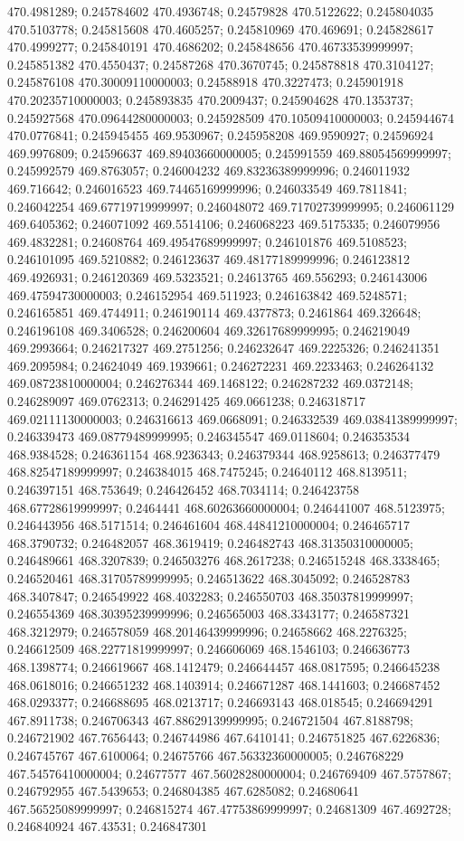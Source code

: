 470.4981289; 0.245784602 470.4936748; 0.24579828 470.5122622; 0.245804035 470.5103778; 0.245815608 470.4605257; 0.245810969 470.469691; 0.245828617 470.4999277; 0.245840191 470.4686202; 0.245848656 470.46733539999997; 0.245851382 470.4550437; 0.24587268 470.3670745; 0.245878818 470.3104127; 0.245876108 470.30009110000003; 0.24588918 470.3227473; 0.245901918 470.20235710000003; 0.245893835 470.2009437; 0.245904628 470.1353737; 0.245927568 470.09644280000003; 0.245928509 470.10509410000003; 0.245944674 470.0776841; 0.245945455 469.9530967; 0.245958208 469.9590927; 0.24596924 469.9976809; 0.24596637 469.89403660000005; 0.245991559 469.88054569999997; 0.245992579 469.8763057; 0.246004232 469.83236389999996; 0.246011932 469.716642; 0.246016523 469.74465169999996; 0.246033549 469.7811841; 0.246042254 469.67719719999997; 0.246048072 469.71702739999995; 0.246061129 469.6405362; 0.246071092 469.5514106; 0.246068223 469.5175335; 0.246079956 469.4832281; 0.24608764 469.49547689999997; 0.246101876 469.5108523; 0.246101095 469.5210882; 0.246123637 469.48177189999996; 0.246123812 469.4926931; 0.246120369 469.5323521; 0.24613765 469.556293; 0.246143006 469.47594730000003; 0.246152954 469.511923; 0.246163842 469.5248571; 0.246165851 469.4744911; 0.246190114 469.4377873; 0.2461864 469.326648; 0.246196108 469.3406528; 0.246200604 469.32617689999995; 0.246219049 469.2993664; 0.246217327 469.2751256; 0.246232647 469.2225326; 0.246241351 469.2095984; 0.24624049 469.1939661; 0.246272231 469.2233463; 0.246264132 469.08723810000004; 0.246276344 469.1468122; 0.246287232 469.0372148; 0.246289097 469.0762313; 0.246291425 469.0661238; 0.246318717 469.02111130000003; 0.246316613 469.0668091; 0.246332539 469.03841389999997; 0.246339473 469.08779489999995; 0.246345547 469.0118604; 0.246353534 468.9384528; 0.246361154 468.9236343; 0.246379344 468.9258613; 0.246377479 468.82547189999997; 0.246384015 468.7475245; 0.24640112 468.8139511; 0.246397151 468.753649; 0.246426452 468.7034114; 0.246423758 468.67728619999997; 0.2464441 468.60263660000004; 0.246441007 468.5123975; 0.246443956 468.5171514; 0.246461604 468.44841210000004; 0.246465717 468.3790732; 0.246482057 468.3619419; 0.246482743 468.31350310000005; 0.246489661 468.3207839; 0.246503276 468.2617238; 0.246515248 468.3338465; 0.246520461 468.31705789999995; 0.246513622 468.3045092; 0.246528783 468.3407847; 0.246549922 468.4032283; 0.246550703 468.35037819999997; 0.246554369 468.30395239999996; 0.246565003 468.3343177; 0.246587321 468.3212979; 0.246578059 468.20146439999996; 0.24658662 468.2276325; 0.246612509 468.22771819999997; 0.246606069 468.1546103; 0.246636773 468.1398774; 0.246619667 468.1412479; 0.246644457 468.0817595; 0.246645238 468.0618016; 0.246651232 468.1403914; 0.246671287 468.1441603; 0.246687452 468.0293377; 0.246688695 468.0213717; 0.246693143 468.018545; 0.246694291 467.8911738; 0.246706343 467.88629139999995; 0.246721504 467.8188798; 0.246721902 467.7656443; 0.246744986 467.6410141; 0.246751825 467.6226836; 0.246745767 467.6100064; 0.24675766 467.56332360000005; 0.246768229 467.54576410000004; 0.24677577 467.56028280000004; 0.246769409 467.5757867; 0.246792955 467.5439653; 0.246804385 467.6285082; 0.24680641 467.56525089999997; 0.246815274 467.47753869999997; 0.24681309 467.4692728; 0.246840924 467.43531; 0.246847301 